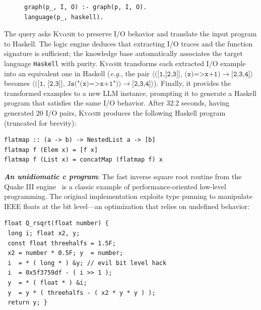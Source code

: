 \documentclass[nonacm,sigplan,review]{acmart}
\def\eg{{\em e.g.}, }
\newcommand{\sys}{{\scshape Kv{$\alpha$}sir}\xspace}
\newcommand{\heading}[1]{\vspace{2pt}\noindent\textbf{\emph{#1}}:\enspace}
\begin{document}
\begin{figure}
\begin{verbatim}
graph(p_, I, O) :- graph(p, I, O).
language(p_, haskell).
\end{verbatim}
\end{figure}
The query asks \sys to preserve I/O behavior and translate the input program to Haskell.
The logic engine deduces that extracting I/O traces and the function signature is
sufficient; the knowledge base automatically associates the target language
\texttt{Haskell} with purity.
\sys transforms each extracted I/O example into an equivalent one in Haskell (\eg 
the pair $\langle\texttt{([1,[2,3]], (x)=>x+1)}\to\texttt{[2,3,4]}\rangle$ 
becomes $\langle(\texttt{[1, [2,3]], Js("(x)=>x+1"))}\to\texttt{[2,3,4]}\rangle$).
Finally, it provides the transformed examples to a new LLM instance, prompting it
to generate a Haskell program that satisfies the same I/O behavior.
After 32.2 seconds, having generated 20 I/O pairs, \sys produces the following
Haskell program (truncated for brevity):
\begin{verbatim}
flatmap :: (a -> b) -> NestedList a -> [b]
flatmap f (Elem x) = [f x]
flatmap f (List x) = concatMap (flatmap f) x
\end{verbatim}

\heading{An unidiomatic c program}
The fast inverse square root routine from the Quake III
engine~\cite{fast_inv_sqrt}
is a classic example of performance-oriented low-level programming.
The original implementation exploits type punning to manipulate IEEE
floats at the bit level---an optimization that relies on undefined behavior:

\begin{verbatim}
float Q_rsqrt(float number) {
 long i; float x2, y;
 const float threehalfs = 1.5F;
 x2 = number * 0.5F; y  = number;
 i  = * ( long * ) &y; // evil bit level hack
 i  = 0x5f3759df - ( i >> 1 );
 y  = * ( float * ) &i;
 y  = y * ( threehalfs - ( x2 * y * y ) );
 return y; }
\end{verbatim}
\end{document}
